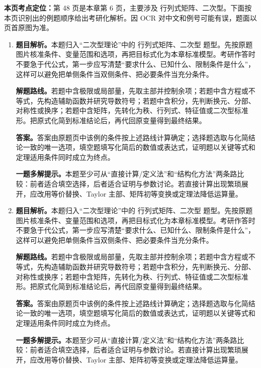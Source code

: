 \begin{solutionblock}
\textbf{本页考点定位：}第 48 页是本章第 6 页，主要涉及 行列式矩阵、二次型。下面按本页识别出的例题顺序给出考研化解析。因 OCR 对中文和例号可能有误，题面以页首原图为准。

\begin{enumerate}[label=\textbf{例\arabic*.}, leftmargin=2.4em]

\item \textbf{题目解析。}本题归入“二次型理论”中的 行列式矩阵、二次型 题型。先按原题图片核准条件、变量范围和选项，再把目标式化为本章标准模型。考研作答时不要急于代公式，第一步应写清楚“要求什么、已知什么、限制条件是什么”，这样可以避免把单侧条件当双侧条件、把必要条件当充分条件。

\textbf{解题路线。}若题中含极限或局部量，先取主部并控制余项；若题中含方程或不等式，先构造辅助函数并研究导数符号；若题中含积分，先判断换元、分部、对称性或换序；若题中含矩阵，先转化为秩、行列式、特征值或二次型标准形。把原式化简到标准结论后，再代回原变量得到最终结果。

\textbf{答案。}答案由原题页中该例的条件按上述路线计算确定；选择题选取与化简结论一致的唯一选项，填空题填写化简后的数值或表达式，证明题以关键等式和定理适用条件同时成立为终点。

\textbf{一题多解提示。}本题至少可从“直接计算/定义法”和“结构化方法”两条路比较：前者适合填空选择，后者适合证明与参数讨论。若直接计算出现繁琐展开，应改用等价替换、Taylor 主部、矩阵初等变换或定理法降低运算量。

\item \textbf{题目解析。}本题归入“二次型理论”中的 行列式矩阵、二次型 题型。先按原题图片核准条件、变量范围和选项，再把目标式化为本章标准模型。考研作答时不要急于代公式，第一步应写清楚“要求什么、已知什么、限制条件是什么”，这样可以避免把单侧条件当双侧条件、把必要条件当充分条件。

\textbf{解题路线。}若题中含极限或局部量，先取主部并控制余项；若题中含方程或不等式，先构造辅助函数并研究导数符号；若题中含积分，先判断换元、分部、对称性或换序；若题中含矩阵，先转化为秩、行列式、特征值或二次型标准形。把原式化简到标准结论后，再代回原变量得到最终结果。

\textbf{答案。}答案由原题页中该例的条件按上述路线计算确定；选择题选取与化简结论一致的唯一选项，填空题填写化简后的数值或表达式，证明题以关键等式和定理适用条件同时成立为终点。

\textbf{一题多解提示。}本题至少可从“直接计算/定义法”和“结构化方法”两条路比较：前者适合填空选择，后者适合证明与参数讨论。若直接计算出现繁琐展开，应改用等价替换、Taylor 主部、矩阵初等变换或定理法降低运算量。

\end{enumerate}
\end{solutionblock}



